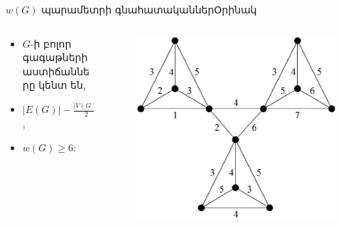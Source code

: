 \begin{frame}{$w(G)$ պարամետրի գնահատականներ}{Օրինակ}
\begin{columns}
\begin{column}{0.45\textwidth}
\begin{itemize}
    \item $G$-ի բոլոր գագաթների աստիճանները կենտ են,
    \item $|E(G)|-\frac{|V(G)|}{2}=15$,
    \item $w(G) \geq 6$:
\end{itemize}
    
\end{column}
\begin{column}{0.55\textwidth}
\begin{figure}[h]
\begin{center}
\includegraphics[width=\textwidth]{figures/W-bound-fig2.eps}
\end{center}
\end{figure}

\end{column}
\end{columns}
\end{frame}